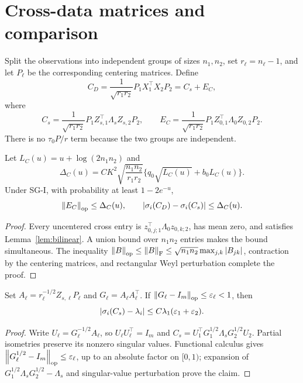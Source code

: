 \section{Cross-data matrices and comparison}\label{sec:cdm}
Split the observations into independent groups of sizes $n_1,n_2$, set $r_\ell=n_\ell-1$, and let $P_\ell$ be the corresponding centering matrices.  Define
\begin{equation}\label{eq:cdm}
C_D=\frac1{\sqrt{r_1r_2}}P_1X_1^\top X_2P_2=C_s+E_C,
\end{equation}
where
\begin{equation}
C_s=\frac1{\sqrt{r_1r_2}}P_1Z_{s,1}^\top\Lambda_sZ_{s,2}P_2,
\qquad
E_C=\frac1{\sqrt{r_1r_2}}P_1Z_{0,1}^\top\Lambda_0Z_{0,2}P_2.
\end{equation}
There is no $\tau_0P/r$ term because the two groups are independent.

\begin{theorem}\label{thm:cdm}
Let $L_C(u)=u+\log(2n_1n_2)$ and
\begin{equation}
\Delta_C(u)=CK^2\sqrt{\frac{n_1n_2}{r_1r_2}}
\{q_0\sqrt{L_C(u)}+b_0L_C(u)\}.
\end{equation}
Under SG-I, with probability at least $1-2e^{-u}$,
\begin{equation}
\left\lVert E_C\right\rVert_{\mathrm{op}}\le\Delta_C(u),
\qquad
\left\lvert\sigma_i(C_D)-\sigma_i(C_s)\right\rvert\le\Delta_C(u).
\end{equation}
\end{theorem}
\begin{proof}
Every uncentered cross entry is $z_{0,j;1}^\top\Lambda_0z_{0,k;2}$, has mean zero, and satisfies Lemma~\ref{lem:bilinear}.  A union bound over $n_1n_2$ entries makes the bound simultaneous.  The inequality $\left\lVert B\right\rVert_{\mathrm{op}}\le\left\lVert B\right\rVert_{\mathrm{F}}\le\sqrt{n_1n_2}\max_{j,k}\left\lvert B_{jk}\right\rvert$, contraction by the centering matrices, and rectangular Weyl perturbation complete the proof.
\end{proof}

\begin{proposition}\label{prop:cdmpop}
Set $A_\ell=r_\ell^{-1/2}Z_{s,\ell}P_\ell$ and $G_\ell=A_\ell A_\ell^\top$.  If $\left\lVert G_\ell-I_m\right\rVert_{\mathrm{op}}\le\varepsilon_\ell<1$, then
\begin{equation}
\left\lvert\sigma_i(C_s)-\lambda_i\right\rvert\le C\lambda_1(\varepsilon_1+\varepsilon_2).
\end{equation}
\end{proposition}
\begin{proof}
Write $U_\ell=G_\ell^{-1/2}A_\ell$, so $U_\ell U_\ell^\top=I_m$ and
$C_s=U_1^\top G_1^{1/2}\Lambda_sG_2^{1/2}U_2$.  Partial isometries preserve its nonzero singular values.  Functional calculus gives $\left\lVert G_\ell^{1/2}-I_m\right\rVert_{\mathrm{op}}\le\varepsilon_\ell$, up to an absolute factor on $[0,1)$; expansion of $G_1^{1/2}\Lambda_sG_2^{1/2}-\Lambda_s$ and singular-value perturbation prove the claim.
\end{proof}

